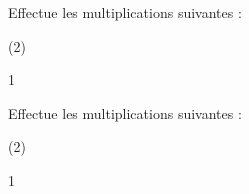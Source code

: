 \documentclass[a4paper,11pt]{report}
\begin{document}
\begin{exop}{
Effectue les multiplications suivantes : 
\bigskip
\begin{tasks}(2)
\end{tasks}
\vspace*{1cm}
}{1}
\end{exop}


\begin{exop}{
Effectue les multiplications suivantes : 
\bigskip
\begin{tasks}(2)
\end{tasks}
\vspace*{1cm}
}{1}
\end{exop}
\end{document}
